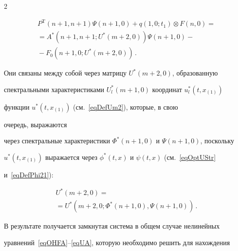 \begin{multicols}{2}
\vspace*{-12pt}





\noindent


\begin{multline}


\label{eqPHFA}


  P^\mathrm{T}(n+1,n+1)  \Psi(n+1,0) + q(1,0;t_1) \otimes F(n,0) ={} \\


{}=  A^*(n+1,n+1; U^*(m+2,0))  \Psi(n+1,0) -{}\\


{}- F_0(n+1,0; U^*(m+2,0))\,.


\end{multline}


Они связаны между собой через мат\-ри\-цу ${U^*(m+2,0)}$, образованную 


спектральными характеристиками ${U^*_l(m+1,0)}$ координат $u^*_l(t,x_{(1)})$ 


функции $u^*(t,x_{(1)})$ (см.~\eqref{eqDefUm2}), которые, в свою\linebreak\vspace*{-12pt}


\columnbreak





\noindent


 очередь, выражаются 


через спектральные характеристики ${\Phi^*(n+1,0)}$ и ${\Psi(n+1,0)}$, поскольку 


$u^*(t,x_{(1)})$ выражается через $\phi^*(t,x)$ и $\psi(t,x)$ (см.~\eqref{eqOptUStr} 


и~\eqref{eqDefPhi21}):


\begin{multline}


\label{eqUA}


  U^*(m+2,0) = {}\\


  {}=U^*(m+2,0; \Phi^*(n+1,0), \Psi(n+1,0))\,.


\end{multline}





В результате получается замкнутая сис\-те\-ма в общем случае нелинейных 


уравнений~\eqref{eqOHFA}--\eqref{eqUA}, которую необходимо решить для нахождения 



\end{multicols}

